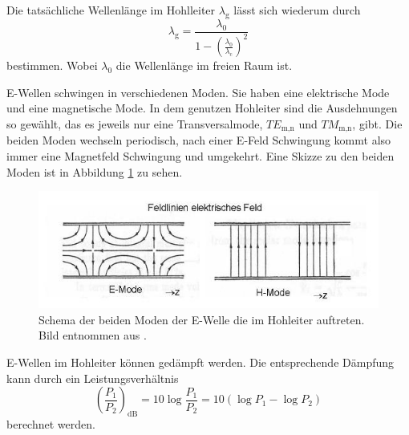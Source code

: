 Die tatsächliche Wellenlänge im Hohlleiter $\lambda _\text{g}$ lässt sich wiederum durch 
\begin{equation}
    \lambda _\text{g} = \frac{\lambda _{0}}{1 - \left ( \frac{\lambda _0}{\lambda _\text{c}} \right )^2}
    \label{eq:wellenlaenge_hohleiter}
\end{equation}
bestimmen.
Wobei $\lambda _0$ die Wellenlänge im freien Raum ist.

E-Wellen schwingen in verschiedenen Moden.
Sie haben eine elektrische Mode und eine magnetische Mode.
In dem genutzen Hohleiter sind die Ausdehnungen so gewählt, das es jeweils nur eine Transversalmode, $TE_\text{m,n}$ und $TM_\text{m,n}$, gibt.
Die beiden Moden wechseln periodisch, nach einer E-Feld Schwingung kommt also immer eine Magnetfeld Schwingung und umgekehrt.
Eine Skizze zu den beiden Moden ist in Abbildung \ref{fig:Moden_Hohleiter} zu sehen.

\begin{figure}
    \centering
    \includegraphics[width=\textwidth]{content/data/Moden_Hohleiter.JPG}
    \caption{Schema der beiden Moden der E-Welle die im Hohleiter auftreten. Bild entnommen aus \cite{wikipedia}.}
    \label{fig:Moden_Hohleiter}
\end{figure}

E-Wellen im Hohleiter können gedämpft werden. Die entsprechende Dämpfung kann durch ein Leistungsverhältnis
\begin{equation}
    \left (\frac{P_1}{P_2} \right )_\text{dB} = 10 \log \frac{P_1}{P_2} = 10 \left ( \log P_1 - \log P_2 \right )
\end{equation}
berechnet werden.

